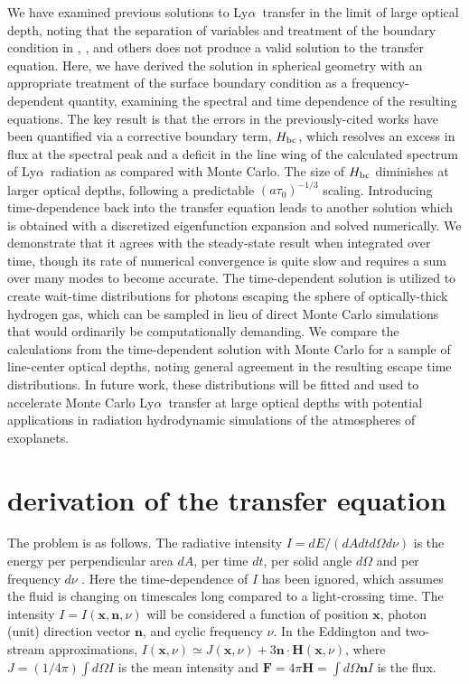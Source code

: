\documentclass{aastex63}
\renewcommand{\vec}[1]{\mathbf{#1}}
\newcommand\lya{Ly$\alpha$\ }
\begin{document}
We have examined previous solutions to \lya transfer in the limit of large optical depth, noting that the separation of variables and treatment of the boundary condition in \cite{1973MNRAS.162...43H}, \cite{1990ApJ...350..216N}, \cite{2006ApJ...649...14D} and others does not produce a valid solution to the transfer equation. Here, we have derived the solution in spherical geometry with an appropriate treatment of the surface boundary condition as a frequency-dependent quantity, examining the spectral and time dependence of the resulting equations. The key result is that the errors in the previously-cited works have been quantified via a corrective boundary term, $H_{\rm bc}$, which resolves an excess in flux at the spectral peak and a deficit in the line wing of the calculated spectrum of \lya radiation as compared with Monte Carlo. The size of $H_{\rm bc}$ diminishes at larger optical depths, following a predictable $(a\tau_0)^{-1/3}$ scaling. Introducing time-dependence back into the transfer equation leads to another solution which is obtained with a discretized eigenfunction expansion and solved numerically. We demonstrate that it agrees with the steady-state result when integrated over time, though its rate of numerical convergence is quite slow and requires a sum over many modes to become accurate. The time-dependent solution is utilized to create wait-time distributions for photons escaping the sphere of optically-thick hydrogen gas, which can be sampled in lieu of direct Monte Carlo simulations that would ordinarily be computationally demanding. We compare the calculations from the time-dependent solution with Monte Carlo for a sample of line-center optical depths, noting general agreement in the resulting escape time distributions. In future work, these distributions will be fitted and used to accelerate Monte Carlo \lya transfer at large optical depths with potential applications in radiation hydrodynamic simulations of the atmospheres of exoplanets.

\acknowledgments

\appendix
\restartappendixnumbering
\section{ derivation of the transfer equation } \label{app:rteqn_derivation}

The problem is as follows. The radiative intensity $I = dE/(dA dt d\Omega d\nu)$ is the energy per perpendicular area $dA$, per time $dt$, per solid angle $d\Omega$ and per frequency $d\nu$ \citep{1986rpa..book.....R}. Here the time-dependence of $I$ has been ignored, which assumes the fluid is changing on timescales long compared to a light-crossing time. The intensity $I=I(\vec{x},\vec{n}, \nu)$ will be considered a function of position $\vec{x}$, photon (unit) direction vector $\vec{n}$, and cyclic frequency $\nu$. In the Eddington and two-stream approximations, $I(\vec{x},\nu) \simeq J(\vec{x},\nu) + 3 \vec{n} \cdot \vec{H}(\vec{x},\nu)$, where $J=(1/4\pi) \int d\Omega I$ is the mean intensity and $\vec{F} = 4\pi \vec{H}= \int d\Omega \vec{n} I$ is the flux.  
\end{document}
